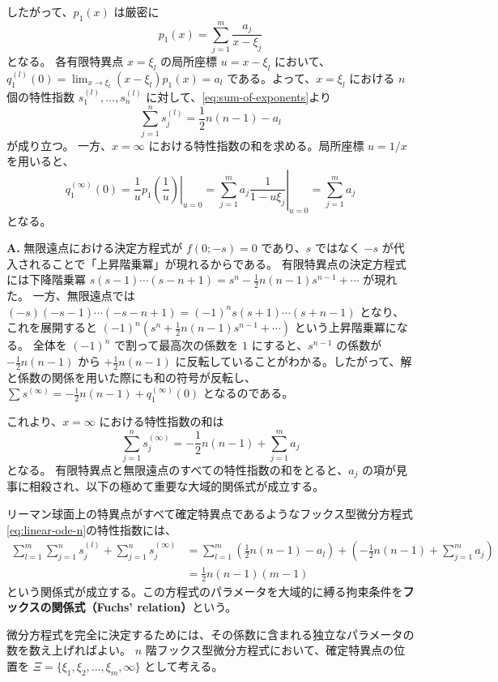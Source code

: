 したがって、$p_{1}(x)$ は厳密に
\begin{equation}\label{eq:2.4_p1_coefficient_1-ord_pole}
    p_{1}(x) = \sum_{j=1}^{m} \frac{a_{j}}{x-\xi_{j}}
\end{equation}
となる。
各有限特異点 $x=\xi_{l}$ の局所座標 $u = x-\xi_{l}$ において、$q_{1}^{(l)}(0) = \lim_{x \to \xi_{l}} (x-\xi_{l})p_{1}(x) = a_{l}$ である。よって、$x=\xi_{l}$ における $n$ 個の特性指数 $s_{1}^{(l)}, \dots, s_{n}^{(l)}$ に対して、\eqref{eq:sum-of-exponents}より
\[
\sum_{j=1}^{n} s_{j}^{(l)} = \frac{1}{2}n(n-1) - a_{l}
\]
が成り立つ。
一方、$x=\infty$ における特性指数の和を求める。局所座標 $u=1/x$ を用いると、
\[
q_{1}^{(\infty)}(0) = \left. \frac{1}{u}p_{1}\left(\frac{1}{u}\right) \right|_{u=0} = \left. \sum_{j=1}^{m} a_{j}\frac{1}{1-u\xi_{j}} \right|_{u=0} = \sum_{j=1}^{m} a_{j}
\]
となる。

\begin{Q}
\textbf{A.} 無限遠点における決定方程式が $f(0; -s) = 0$ であり、$s$ ではなく $-s$ が代入されることで「上昇階乗冪」が現れるからである。
有限特異点の決定方程式には下降階乗冪 $s(s-1)\cdots(s-n+1) = s^{n} - \frac{1}{2}n(n-1)s^{n-1} + \cdots$ が現れた。
一方、無限遠点では $(-s)(-s-1)\cdots(-s-n+1) = (-1)^{n} s(s+1)\cdots(s+n-1)$ となり、これを展開すると $(-1)^{n} (s^{n} + \frac{1}{2}n(n-1)s^{n-1} + \cdots)$ という上昇階乗冪になる。
全体を $(-1)^{n}$ で割って最高次の係数を $1$ にすると、$s^{n-1}$ の係数が $-\frac{1}{2}n(n-1)$ から $+\frac{1}{2}n(n-1)$ に反転していることがわかる。したがって、解と係数の関係を用いた際にも和の符号が反転し、$\sum s^{(\infty)} = -\frac{1}{2}n(n-1) + q_{1}^{(\infty)}(0)$ となるのである。
\end{Q}

これより、$x=\infty$ における特性指数の和は
\[
\sum_{j=1}^{n}s_{j}^{(\infty)} = -\frac{1}{2}n(n-1) + \sum_{j=1}^{m} a_{j}
\]
となる。
有限特異点と無限遠点のすべての特性指数の和をとると、$a_{j}$ の項が見事に相殺され、以下の極めて重要な大域的関係式が成立する。

\begin{proposition}\label{prop:fuchs_relation}
リーマン球面上の特異点がすべて確定特異点であるようなフックス型微分方程式\eqref{eq:linear-ode-n}の特性指数には、
\begin{align*}
\sum_{l=1}^{m}\sum_{j=1}^{n} s_{j}^{(l)} + \sum_{j=1}^{n} s_{j}^{(\infty)} &= \sum_{l=1}^{m} \left( \frac{1}{2}n(n-1) - a_{l} \right) + \left( -\frac{1}{2}n(n-1) + \sum_{j=1}^{m} a_{j} \right) \\
&= \frac{1}{2}n(n-1)(m-1)
\end{align*}
という関係式が成立する。この方程式のパラメータを大域的に縛る拘束条件を\textbf{フックスの関係式（Fuchs' relation）}という。
\end{proposition}
微分方程式を完全に決定するためには、その係数に含まれる独立なパラメータの数を数え上げればよい。
$n$ 階フックス型微分方程式において、確定特異点の位置を $\Xi=\{\xi_{1}, \xi_{2}, \dots, \xi_{m}, \infty\}$ として考える。

